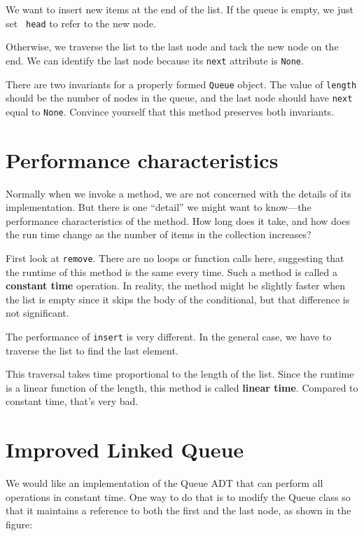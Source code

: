 We want to insert new items at the end of the list.
If the queue is empty, we just set {\tt
head} to refer to the new node.

Otherwise, we traverse the list to the last node and
tack the new node on the end.  We can identify the last node because
its {\tt next} attribute is {\tt None}.

There are two invariants for a properly formed {\tt Queue} object.
The value of {\tt length} should be the number of nodes in the
queue, and the last node should have {\tt next} equal to
{\tt None}.  Convince yourself that this method preserves
both invariants.


\section{Performance characteristics}

Normally when we invoke a method, we are not concerned with the
details of its implementation.  But there is one ``detail''
we might want to know---the performance characteristics of the
method.  How long does it take, and how does the run time change
as the number of items in the collection increases?

First look at {\tt remove}.
There are no loops or function calls here, suggesting that
the runtime of this method is the same every time.  Such a method
is called a {\bf constant time} operation.
In reality, the method might be slightly faster
when the list is empty since it skips the body of the conditional,
but that difference is not significant.


The performance of {\tt insert} is very different.
In the general case, we have to
traverse the list to find the last element.

This traversal takes time proportional to the length of the
list.  Since the runtime is a linear function of the length,
this method is called {\bf linear time}.  Compared to
constant time, that's very bad.



\section{Improved Linked Queue}

We would like an implementation of the Queue ADT that can
perform all operations in constant time.  One way to
do that is to modify the Queue class so that it
maintains a reference to both the first and the last node,
as shown in the figure:

